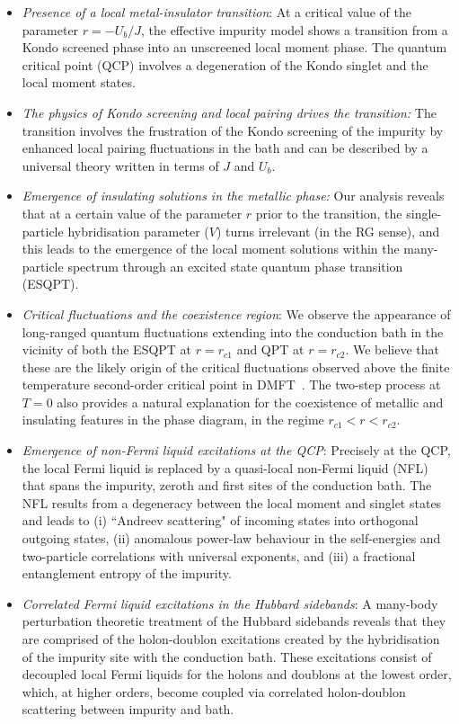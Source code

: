 \documentclass{iopart}
\begin{document}
\begin{itemize}
\item {\it Presence of a local metal-insulator transition}: At a critical value of the parameter $r=-U_{b}/J$, the effective impurity model shows a transition from a Kondo screened phase into an unscreened local moment phase. The quantum critical point (QCP) involves a degeneration of the Kondo singlet and the local moment states.
\item {\it The physics of Kondo screening and local pairing drives the transition:}
The transition involves the frustration of the Kondo screening of the impurity by enhanced local pairing fluctuations in the bath and can be described by a universal theory written in terms of $J$ and $U_b$.
\item {\it Emergence of insulating solutions in the metallic phase:}
Our analysis reveals that at a certain value of the parameter $r$ prior to the transition, the single-particle hybridisation parameter ($V$) turns irrelevant (in the RG sense), and this leads to the emergence of the local moment solutions within the many-particle spectrum through an excited state quantum phase transition (ESQPT).
\item {\it Critical fluctuations and the coexistence region}: 
We observe the appearance of long-ranged quantum fluctuations extending into the conduction bath in the vicinity of both the ESQPT at $r=r_{c1}$ and QPT at $r=r_{c2}$. We believe that these are the likely origin of the critical fluctuations observed above the finite temperature second-order critical point in DMFT~\cite{terletska_mott_2011,vucicevic_2013}. The two-step process at $T=0$ also provides a natural explanation for the coexistence of metallic and insulating features in the phase diagram, in the regime $r_{c1}<r<r_{c2}$.
\item {\it Emergence of non-Fermi liquid excitations at the QCP}:
Precisely at the QCP, the local  Fermi liquid is replaced by a quasi-local non-Fermi liquid (NFL) that spans the impurity, zeroth and first sites of the conduction bath. The NFL results from a degeneracy between the local moment and singlet states and leads to (i) ``Andreev scattering" of incoming states into orthogonal outgoing states, (ii) anomalous power-law behaviour in the self-energies and two-particle correlations with universal exponents, and (iii) a fractional entanglement entropy of the impurity.
\item {\it Correlated Fermi liquid excitations in the Hubbard sidebands}:
A many-body perturbation theoretic treatment of the Hubbard sidebands reveals that they are comprised of the holon-doublon excitations created by the hybridisation of the impurity site with the conduction bath. These excitations consist of decoupled local Fermi liquids for the holons and doublons at the lowest order, which, at higher orders, become coupled via correlated holon-doublon scattering between impurity and bath.
\end{itemize}
\end{document}
